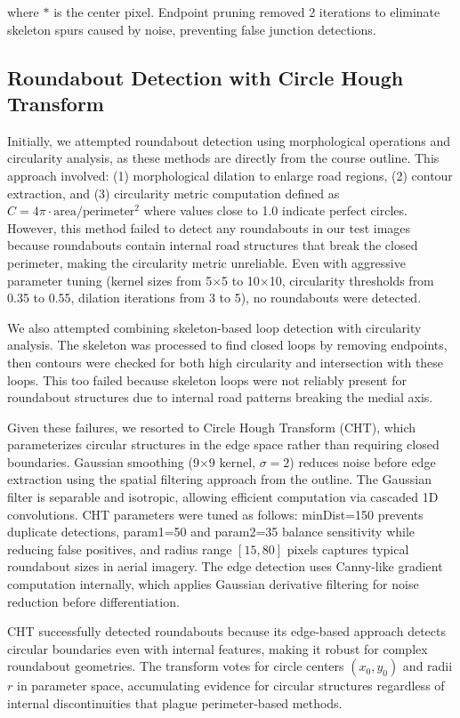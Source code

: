 \documentclass[conference]{IEEEtran}
\begin{document}
where $*$ is the center pixel. Endpoint pruning removed 2 iterations to eliminate skeleton spurs caused by noise, preventing false junction detections.

\subsection{Roundabout Detection with Circle Hough Transform}

Initially, we attempted roundabout detection using morphological operations and circularity analysis, as these methods are directly from the course outline. This approach involved: (1) morphological dilation to enlarge road regions, (2) contour extraction, and (3) circularity metric computation defined as $C = 4\pi \cdot \text{area}/\text{perimeter}^2$ where values close to 1.0 indicate perfect circles. However, this method failed to detect any roundabouts in our test images because roundabouts contain internal road structures that break the closed perimeter, making the circularity metric unreliable. Even with aggressive parameter tuning (kernel sizes from 5$\times$5 to 10$\times$10, circularity thresholds from 0.35 to 0.55, dilation iterations from 3 to 5), no roundabouts were detected.

We also attempted combining skeleton-based loop detection with circularity analysis. The skeleton was processed to find closed loops by removing endpoints, then contours were checked for both high circularity and intersection with these loops. This too failed because skeleton loops were not reliably present for roundabout structures due to internal road patterns breaking the medial axis.

Given these failures, we resorted to Circle Hough Transform (CHT), which parameterizes circular structures in the edge space rather than requiring closed boundaries. Gaussian smoothing (9$\times$9 kernel, $\sigma=2$) reduces noise before edge extraction using the spatial filtering approach from the outline. The Gaussian filter is separable and isotropic, allowing efficient computation via cascaded 1D convolutions. CHT parameters were tuned as follows: minDist=150 prevents duplicate detections, param1=50 and param2=35 balance sensitivity while reducing false positives, and radius range $[15, 80]$ pixels captures typical roundabout sizes in aerial imagery. The edge detection uses Canny-like gradient computation internally, which applies Gaussian derivative filtering for noise reduction before differentiation.

CHT successfully detected roundabouts because its edge-based approach detects circular boundaries even with internal features, making it robust for complex roundabout geometries. The transform votes for circle centers $(x_0, y_0)$ and radii $r$ in parameter space, accumulating evidence for circular structures regardless of internal discontinuities that plague perimeter-based methods.
\end{document}
